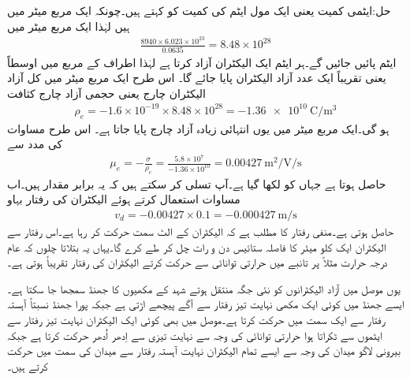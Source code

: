 حل:ایٹمی کمیت  یعنی ایک مول ایٹم کی کمیت کو کہتے ہیں۔چونکہ ایک مربع میٹر میں  ہیں لہٰذا ایک مربع میٹر میں
\begin{align*}
\frac{8940 \times 6.023 \times 10^{23}}{0.0635}=8.48 \times 10^{28}
\end{align*} 
ایٹم پائیں جائیں گے۔ہر ایٹم ایک الیکٹران آزاد کرتا ہے لہٰذا  اطراف کے مربع میں اوسطاً  یعنی تقریباً ایک عدد آزاد الیکٹران پایا جائے گا۔ اس طرح  ایک مربع میٹر میں کل آزاد الیکٹران چارج یعنی حجمی آزاد چارج کثافت
\begin{align}\label{مساوات_کپیسٹر_موصل_آزاد_چارج_کثافت}
\rho_e=-1.6 \times 10^{-19} \times 8.48 \times 10^{28}=\SI{-1.36e10}{\coulomb \per \meter^3}
\end{align}
ہو گی۔ایک مربع میٹر میں یوں انتہائی زیادہ آزاد چارج پایا جاتا ہے۔ اس طرح مساوات  کی مدد سے
\begin{align*}
\mu_e=-\frac{\sigma}{\rho_e}=\frac{5.8 \times 10^7}{-1.36 \times 10^{10}}=\SI{0.00427}{\meter \squared \per \volt \per \second}
\end{align*}
حاصل ہوتا ہے جہاں  کو  لکھا گیا ہے۔آپ تسلی کر سکتے ہیں کہ یہ برابر مقدار ہیں۔اب مساوات   استعمال کرتے ہوئے الیکٹران کی رفتار بہاو 
\begin{align*}
v_d = -0.00427 \times 0.1=\SI{-0.000427}{\meter \per \second}
\end{align*}
حاصل ہوتی ہے۔منفی رفتار کا مطلب ہے کہ الیکٹران  کے الٹ سمت حرکت کر رہا ہے۔اس رفتار سے الیکٹران ایک کلو میٹر کا فاصلہ ستائیس دن و رات چل کر طے کرے گا۔یہاں یہ بتلاتا چلوں کہ عام درجہ حرارت مثلاً  پر تانبے میں حرارتی توانائی سے حرکت کرتے الیکٹران کی رفتار تقریباً  ہوتی ہے۔

یوں موصل میں آزاد الیکٹرانوں کو نئی جگہ منتقل ہوتے  شہد کے مکھیوں کا جھنڈ  سمجھا جا سکتا ہے۔ایسے جھنڈ میں کوئی ایک مکھی نہایت تیز رفتار سے آگے پیچھے اڑتی ہے جبکہ پورا جھنڈ  نسبتاً آہستہ رفتار سے ایک سمت میں حرکت کرتا ہے۔موصل میں بھی کوئی ایک الیکٹران نہایت تیز رفتار سے ایٹموں سے ٹکراتا ہوا حرارتی توانائی کی وجہ سے  نہایت تیزی سے  اِدھر اُدھر حرکت کرتا ہے جبکہ بیرونی لاگو میدان کی وجہ سے ایسے تمام الیکٹران نہایت آہستہ رفتار سے میدان کی سمت میں حرکت کرتے ہیں۔

